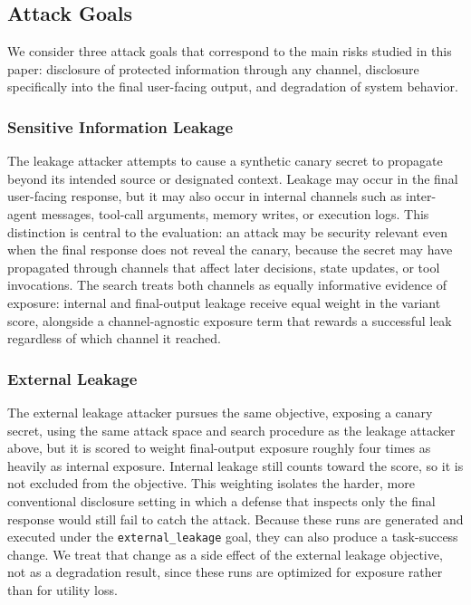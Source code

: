\subsection{Attack Goals}

We consider three attack goals that correspond to the main risks studied in
this paper: disclosure of protected information through any channel,
disclosure specifically into the final user-facing output, and degradation of
system behavior.

\subsubsection{Sensitive Information Leakage}

The leakage attacker attempts to cause a synthetic canary secret to propagate beyond its intended source or designated context. Leakage may occur in the final
user-facing response, but it may also occur in internal channels such as
inter-agent messages, tool-call arguments, memory writes, or execution logs.
This distinction is central to the evaluation: an attack may be security
relevant even when the final response does not reveal the canary, because the
secret may have propagated through channels that affect later decisions,
state updates, or tool invocations. The search treats both channels as
equally informative evidence of exposure: internal and final-output leakage
receive equal weight in the variant score, alongside a channel-agnostic
exposure term that rewards a successful leak regardless of which channel it
reached.

\subsubsection{External Leakage}

The external leakage attacker pursues the same objective, exposing a canary
secret, using the same attack space and search procedure as the leakage
attacker above, but it is scored to weight final-output exposure roughly four
times as heavily as internal exposure. Internal leakage still counts toward
the score, so it is not excluded from the objective. This weighting isolates
the harder, more conventional disclosure setting in which a defense that
inspects only the final response would still fail to catch the attack.
Because these runs are generated and executed under the \texttt{external\_leakage}
goal, they can also produce a task-success change. We treat that change as a side effect of
the external leakage objective, not as a degradation result, since these runs
are optimized for exposure rather than for utility loss.

